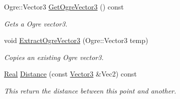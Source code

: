 \begin{DoxyCompactItemize}
Ogre::Vector3 \hyperlink{classphys_1_1Vector3_a17265d86a74139398d310b56ba7e89b8}{GetOgreVector3} () const 
\begin{DoxyCompactList}\small\item\em Gets a Ogre vector3. \item\end{DoxyCompactList}\item 
void \hyperlink{classphys_1_1Vector3_a09a31cb8fe491f61e0cc10d21705a0df}{ExtractOgreVector3} (Ogre::Vector3 temp)
\begin{DoxyCompactList}\small\item\em Copies an existing Ogre vector3. \item\end{DoxyCompactList}\item 
\hyperlink{namespacephys_af7eb897198d265b8e868f45240230d5f}{Real} \hyperlink{classphys_1_1Vector3_a6388c8993a8f09ba2f7fef366858634f}{Distance} (const \hyperlink{classphys_1_1Vector3}{Vector3} \&Vec2) const 
\begin{DoxyCompactList}\small\item\em This return the distance between this point and another. \item\end{DoxyCompactList}\end{DoxyCompactItemize}
